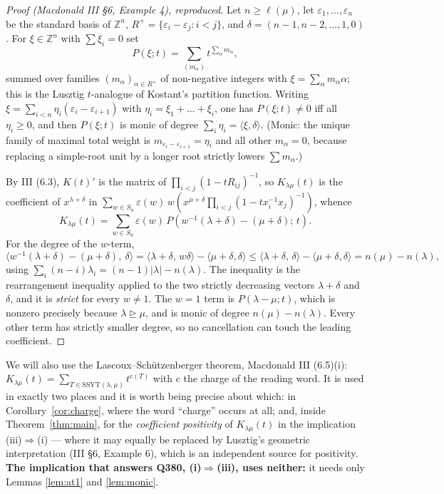 \documentclass[11pt]{article}
\theoremstyle{plain}
\theoremstyle{definition}
\newcommand{\SSYT}{\mathrm{SSYT}}
\newcommand{\Z}{\mathbb{Z}}
\newcommand{\charge}{\mathrm{c}}
\DeclareMathOperator{\dom}{\trianglerighteq}
\begin{document}
\begin{proof}[Proof (Macdonald III \S6, Example 4), reproduced]
Let $n\ge\ell(\mu)$, let $\varepsilon_1,\dots,\varepsilon_n$ be the standard basis of
$\Z^n$, $R^+=\{\varepsilon_i-\varepsilon_j: i<j\}$, and
$\delta=(n-1,n-2,\dots,1,0)$.  For $\xi\in\Z^n$ with $\sum\xi_i=0$ set
\[
   P(\xi;t)=\sum_{(m_\alpha)} t^{\sum_\alpha m_\alpha},
\]
summed over families $(m_\alpha)_{\alpha\in R^+}$ of non-negative integers with
$\xi=\sum_\alpha m_\alpha\alpha$; this is the Lusztig $t$-analogue of Kostant's partition
function.  Writing $\xi=\sum_{i<n}\eta_i(\varepsilon_i-\varepsilon_{i+1})$ with
$\eta_i=\xi_1+\dots+\xi_i$, one has $P(\xi;t)\ne0$ iff all $\eta_i\ge 0$, and then
$P(\xi;t)$ is monic of degree $\sum_i\eta_i=\langle\xi,\delta\rangle$.  (Monic: the unique
family of maximal total weight is $m_{\varepsilon_i-\varepsilon_{i+1}}=\eta_i$ and all
other $m_\alpha=0$, because replacing a simple-root unit by a longer root strictly lowers
$\sum m_\alpha$.)

By III (6.3), $K(t)'$ is the matrix of $\prod_{i<j}(1-tR_{ij})^{-1}$, so $K_{\lambda\mu}(t)$
is the coefficient of $x^{\lambda+\delta}$ in
$\sum_{w\in S_n}\varepsilon(w)\,w\!\left(x^{\mu+\delta}\prod_{i<j}(1-t x_i^{-1}x_j)^{-1}\right)$,
whence
\begin{equation}\label{eq:alt}
   K_{\lambda\mu}(t)=\sum_{w\in S_n}\varepsilon(w)\,
      P\!\left(w^{-1}(\lambda+\delta)-(\mu+\delta);\,t\right).
\end{equation}
For the degree of the $w$-term,
\[
  \big\langle w^{-1}(\lambda+\delta)-(\mu+\delta),\ \delta\big\rangle
   =\langle \lambda+\delta,\,w\delta\rangle-\langle\mu+\delta,\delta\rangle
   \le \langle \lambda+\delta,\,\delta\rangle-\langle\mu+\delta,\delta\rangle
   = n(\mu)-n(\lambda),
\]
using $\sum_i(n-i)\lambda_i=(n-1)|\lambda|-n(\lambda)$.  The inequality is the
rearrangement inequality applied to the two strictly decreasing vectors $\lambda+\delta$
and $\delta$, and it is \emph{strict} for every $w\ne 1$.  The $w=1$ term is
$P(\lambda-\mu;t)$, which is nonzero precisely because $\lambda\dom\mu$, and is monic of
degree $n(\mu)-n(\lambda)$.  Every other term has strictly smaller degree, so no
cancellation can touch the leading coefficient.
\end{proof}

We will also use the Lascoux--Schützenberger theorem, Macdonald III (6.5)(i):
$K_{\lambda\mu}(t)=\sum_{T\in\SSYT(\lambda,\mu)}t^{\charge(T)}$ with $\charge$ the charge of
the reading word.  It is used in exactly two places and it is worth being precise about
which: in Corollary~\ref{cor:charge}, where the word ``charge'' occurs at all; and, inside
Theorem~\ref{thm:main}, for the \emph{coefficient positivity} of $K_{\lambda\mu}(t)$ in the
implication (iii)$\Rightarrow$(i) --- where it may equally be replaced by Lusztig's geometric
interpretation (III \S6, Example 6), which is an independent source for positivity.
\textbf{The implication that answers Q380, (i)$\Rightarrow$(iii), uses neither:} it needs
only Lemmas \ref{lem:at1} and \ref{lem:monic}.
\end{document}
